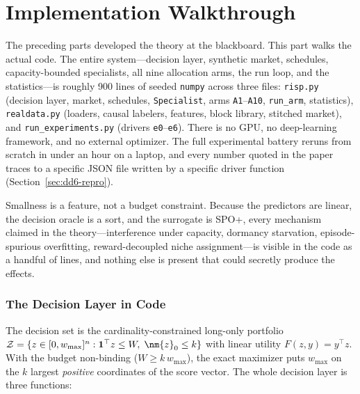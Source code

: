 
\part{Implementation Walkthrough}
\label{sec:dd6-part}

The preceding parts developed the theory at the blackboard. This part walks
the actual code. The entire system---decision layer, synthetic market,
schedules, capacity-bounded specialists, all nine allocation arms, the run
loop, and the statistics---is roughly 900 lines of seeded \texttt{numpy}
across three files: \texttt{risp.py} (decision layer, market, schedules,
\texttt{Specialist}, arms \texttt{A1}--\texttt{A10}, \texttt{run\_arm},
statistics), \texttt{realdata.py} (loaders, causal labelers, features, block
library, stitched market), and \texttt{run\_experiments.py} (drivers
\texttt{e0}--\texttt{e6}).
There is no GPU, no deep-learning framework, and no external optimizer. The
full experimental battery reruns from scratch in under an hour on a laptop,
and every number quoted in the paper traces to a specific JSON file written
by a specific driver function (Section~\ref{sec:dd6-repro}).

\begin{keypoint}
Smallness is a feature, not a budget constraint. Because the predictors are
linear, the decision oracle is a sort, and the surrogate is SPO+, every
mechanism claimed in the theory---interference under capacity, dormancy
starvation, episode-spurious overfitting, reward-decoupled niche
assignment---is visible in the code as a handful of lines, and nothing else
is present that could secretly produce the effects.
\end{keypoint}


\section{The Decision Layer in Code}
\label{sec:dd6-decision}

The decision set is the cardinality-constrained long-only portfolio
$\mathcal{Z} = \{ z \in [0, w_{\max}]^n : \mathbf{1}^\top z \le W,\;
\nm{z}_0 \le k \}$ with linear utility $F(z, y) = y^\top z$. With the budget
non-binding ($W \ge k\, w_{\max}$), the exact maximizer puts $w_{\max}$ on
the $k$ largest \emph{positive} coordinates of the score vector. The whole
decision layer is three functions:

